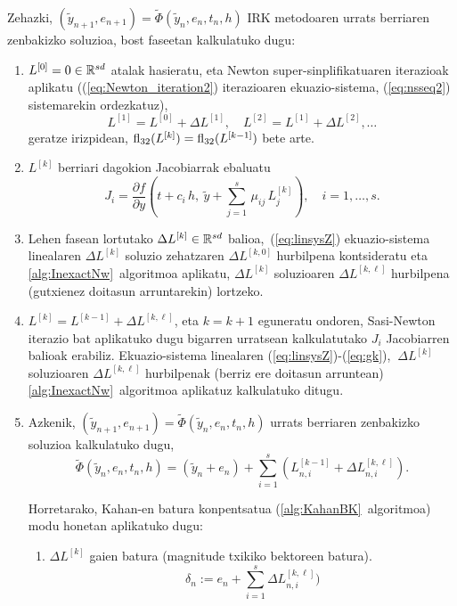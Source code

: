 Zehazki, $(\tilde{y}_{n+1}, e_{n+1})=\tilde{\Phi}(\tilde{y}_n, e_n, t_n, h)$  IRK metodoaren urrats berriaren zenbakizko soluzioa, bost faseetan kalkulatuko dugu:
 \begin{enumerate}
\item
$L^{[0]}=0 \in \mathbb{R}^{sd}$ atalak hasieratu, eta Newton super-sinplifikatuaren iterazioak aplikatu ((\ref{eq:Newton_iteration2}) iterazioaren ekuazio-sistema, (\ref{eq:nsseq2}) sistemarekin ordezkatuz), 
\[
L^{[1]}=L^{[0]} +\Delta L^{[1]}, \quad  L^{[2]}=L^{[1]} +\Delta L^{[2]} , \ldots
\]
geratze irizpidean, $ \mathrm{fl}_{32}(L^{[k]}) = \mathrm{fl}_{32}(L^{[k-1]})$ bete arte.

\item
$L^{[k]}$ berriari dagokion Jacobiarrak ebaluatu 
\begin{equation*}
J_i= \frac{\partial f}{\partial y}\left(t +c_i\,  h,  \ \tilde y+  \sum_{j=1}^{s}\, \mu_{ij}\, L_{j}^{[k]}\right), \quad i=1,\ldots,s.
\end{equation*}
%
\item
Lehen fasean lortutako $\Delta L^{[k]} \in \mathbb{R}^{sd}$ balioa,~(\ref{eq:linsysZ}) ekuazio-sistema linealaren $\Delta L^{[k]}$ soluzio zehatzaren $\Delta L^{[k,0]}$ hurbilpena kontsideratu eta 
\ref{alg:InexactNw}~algoritmoa aplikatu, $\Delta L^{[k]}$ soluzioaren $\Delta L^{[k,\ell]}$ hurbilpena (gutxienez doitasun arruntarekin) lortzeko.

\item 
$L^{[k]} = L^{[k-1]} + \Delta L^{[k,\ell]}$, eta $k=k+1$ eguneratu ondoren, Sasi-Newton iterazio bat aplikatuko dugu bigarren urratsean kalkulatutako $J_i$ Jacobiarren balioak erabiliz. Ekuazio-sistema linealaren (\ref{eq:linsysZ})-(\ref{eq:gk}), $ \ \Delta L^{[k]}$ soluzioaren  $\Delta L^{[k,\ell]}$ hurbilpenak (berriz ere doitasun arruntean)  \ref{alg:InexactNw}~algoritmoa aplikatuz kalkulatuko ditugu.

\item 
Azkenik, $(\tilde{y}_{n+1}, e_{n+1})=\tilde \Phi(\tilde{y}_n, e_n, t_n, h)$  urrats berriaren zenbakizko soluzioa kalkulatuko dugu,
\begin{equation*}
\tilde \Phi(\tilde{y}_n, e_n, t_n, h)=(\tilde y_n + e_n) + \sum_{i=1}^{s}(L_{n,i}^{[k-1]} + \Delta L_{n,i}^{[k,\ell]}).
\end{equation*}

Horretarako, Kahan-en batura konpentsatua (\ref{alg:KahanBK}~algoritmoa) modu honetan aplikatuko dugu:
\begin{enumerate}
\item $\Delta L^{[k]}$ gaien batura (magnitude txikiko bektoreen batura).
\begin{equation*}
\delta_n :=  e_n + \sum_{i=1}^{s} \Delta L_{n,i}^{[k,\ell]})
\end{equation*}


\end{enumerate}
\end{enumerate}
